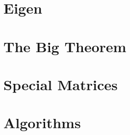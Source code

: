\documentclass[11pt]{article}
\theoremstyle{definition}
\begin{document}
\section{Eigen}
\label{sec:eigen}



\section{The Big Theorem}
\label{sec:bigt}


\section{Special Matrices}
\label{sec:special}



\section{Algorithms}
\label{sec:algorithms}


\end{document}
